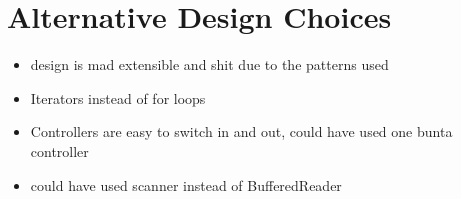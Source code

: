 \documentclass[]{article}
\begin{document}

\section*{Alternative Design Choices}

\begin{itemize}
	\item design is mad extensible and shit due to the patterns used
	\item Iterators instead of for loops
	\item Controllers are easy to switch in and out, could have used one bunta controller
	\item could have used scanner instead of BufferedReader
\end{itemize}

\end{document}

